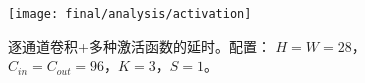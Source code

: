 \begin{figure}
    \centering
    \texttt{[image: final/analysis/activation]}
    \caption{
        逐通道卷积+多种激活函数的延时。配置：
        $H=W=28$，$C_{in}=C_{out}=96$，$K=3$，$S=1$。
    }
    \label{fig:activation_latency}
\end{figure}